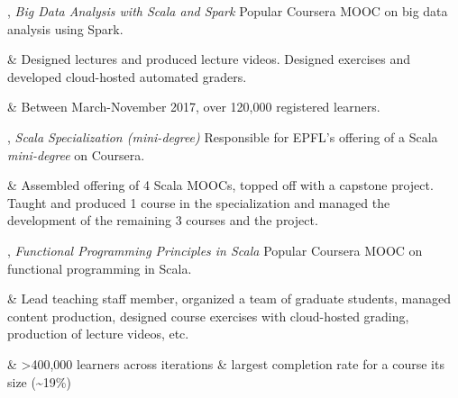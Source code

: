 \documentclass[9pt]{article}
\begin{document}
\medskip
{}

, {\em Big Data Analysis with Scala and Spark} 
\newline\noindent Popular Coursera MOOC on big data analysis using Spark. 
\smallskip
\begin{easylist}[itemize]
& Designed lectures and produced lecture videos. Designed exercises
\newline and developed cloud-hosted automated graders.

& Between March-November 2017, over 120,000 registered learners. 
\end{easylist}

%
\bigskip



, {\em Scala Specialization (mini-degree)} 
\newline\noindent Responsible for EPFL's offering of a Scala {\em mini-degree} on Coursera. 
\smallskip
\begin{easylist}[itemize]
& Assembled offering of 4 Scala MOOCs, topped off with a capstone
\newline project. Taught and produced 1 course in the specialization and
\newline managed the development of the remaining 3 courses and the project.
\end{easylist}
\bigskip


, {\em Functional Programming Principles in Scala} 
\newline\noindent Popular Coursera MOOC on functional programming in Scala. 
\smallskip
\begin{easylist}[itemize]
& Lead teaching staff member, organized a team of graduate
\newline students, managed content production, designed course exercises
\newline with cloud-hosted grading, production of lecture videos, etc.

& >400,000 learners across iterations \& largest completion
\newline rate for a course its size (\textasciitilde19\%)
\end{easylist}
\bigskip
\end{document}

